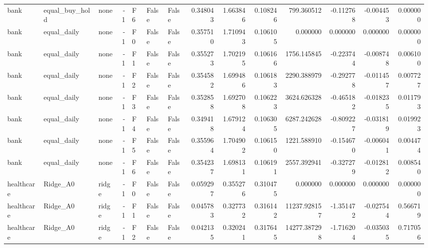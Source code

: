 \begin{tabular}{lllrlllrrrrrrr}
      bank & equal\_buy\_hold &      none &    -1 &  F6 &           False &            False &  0.348043 &  1.663846 & 0.108246 &       799.360512 &          -0.112768 &       -0.004453 &            0.000000 \\
      bank &    equal\_daily &      none &    -1 &  F0 &           False &            False &  0.357510 &  1.710943 & 0.106105 &         0.000000 &           0.000000 &        0.000000 &            0.000000 \\
      bank &    equal\_daily &      none &    -1 &  F1 &           False &            False &  0.355273 &  1.702195 & 0.106166 &      1756.145845 &          -0.223744 &       -0.008748 &            0.006100 \\
      bank &    equal\_daily &      none &    -1 &  F2 &           False &            False &  0.354582 &  1.699486 & 0.106183 &      2290.388979 &          -0.292778 &       -0.011457 &            0.007727 \\
      bank &    equal\_daily &      none &    -1 &  F3 &           False &            False &  0.352858 &  1.692708 & 0.106223 &      3624.626328 &          -0.465182 &       -0.018235 &            0.011793 \\
      bank &    equal\_daily &      none &    -1 &  F4 &           False &            False &  0.349418 &  1.679124 & 0.106305 &      6287.242628 &          -0.809227 &       -0.031819 &            0.019923 \\
      bank &    equal\_daily &      none &    -1 &  F5 &           False &            False &  0.355964 &  1.704902 & 0.106150 &      1221.588910 &          -0.154670 &       -0.006041 &            0.004474 \\
      bank &    equal\_daily &      none &    -1 &  F6 &           False &            False &  0.354237 &  1.698131 & 0.106191 &      2557.392941 &          -0.327279 &       -0.012812 &            0.008540 \\
healthcare &       Ridge\_A0 &     ridge &    -1 &  F0 &           False &            False &  0.059297 &  0.355276 & 0.310475 &         0.000000 &           0.000000 &        0.000000 &            0.000000 \\
healthcare &       Ridge\_A0 &     ridge &    -1 &  F1 &           False &            False &  0.045783 &  0.327732 & 0.316142 &     11237.928157 &          -1.351472 &       -0.027544 &            0.566719 \\
healthcare &       Ridge\_A0 &     ridge &    -1 &  F2 &           False &            False &  0.042135 &  0.320241 & 0.317645 &     14277.387298 &          -1.716204 &       -0.035035 &            0.717056 \\

\end{tabular}
